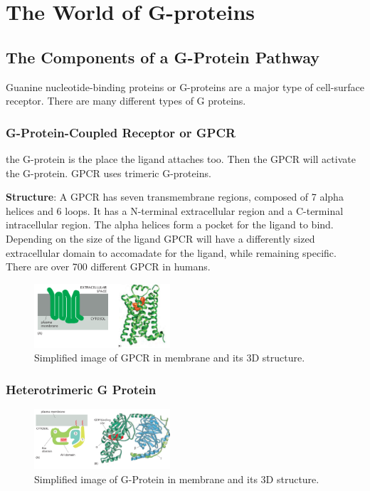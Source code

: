 \documentclass[../main.tex]{subfiles}
\begin{document}
\section{The World of G-proteins}

\subsection{The Components of a G-Protein Pathway}

Guanine nucleotide-binding proteins or G-proteins are a major type of cell-surface receptor. There are many different types of G proteins.

\subsubsection{G-Protein-Coupled Receptor or GPCR}

the G-protein is the place the ligand attaches too. Then the GPCR will activate the G-protein. GPCR uses trimeric G-proteins.

\textbf{Structure}: A GPCR has seven transmembrane regions, composed of 7 alpha helices and 6 loops. It has a N-terminal extracellular region and a C-terminal intracellular region. The alpha helices form a pocket for the ligand to bind. Depending on the size of the ligand GPCR will have a differently sized extracellular domain to accomadate for the ligand, while remaining specific. There are over 700 different GPCR in humans.

\begin{figure}[H]
	\centering
	\includegraphics[width=0.45\textwidth]{GPCR}
	\caption{Simplified image of GPCR in membrane and its 3D structure.}
\end{figure}

\subsubsection{Heterotrimeric G Protein}

\begin{figure}[H]
	\centering
	\includegraphics[width=0.45\textwidth]{G_structure}
	\caption{Simplified image of G-Protein in membrane and its 3D structure.}
\end{figure}
\end{document}
